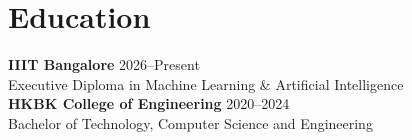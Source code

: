 \documentclass[letterpaper,11pt]{article}
\begin{document}
\section*{Education}
\vspace{1pt}
\small
\textbf{IIIT Bangalore} \hfill 2026--Present\\
Executive Diploma in Machine Learning \& Artificial Intelligence\\[3pt]
\textbf{HKBK College of Engineering} \hfill 2020--2024\\
Bachelor of Technology, Computer Science and Engineering
\end{document}
